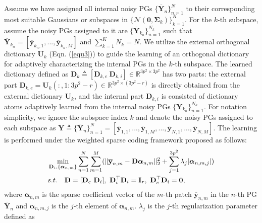\documentclass[10pt,twocolumn,letterpaper]{article}
\begin{document}
Assume we have assigned all internal noisy PGs $\{\mathbf{\overline{Y}}_{n}\}_{n=1}^{N}$ to their corresponding most suitable Gaussians or subspaces in $\{\mathcal{N}(\mathbf{0},\mathbf{\Sigma}_{k})\}_{k=1}^{K}$. For the $k$-th subspace, assume the noisy PGs assigned to it are $\{\mathbf{\overline{Y}}_{k_{n}}\}_{n=1}^{N_{k}}$ such that $\mathbf{\overline{Y}}_{k_{n}}=[\mathbf{\overline{y}}_{k_{n},1},...,\mathbf{\overline{y}}_{k_{n},M}]$ and $\sum_{k=1}^{K}N_{k}=N$. We utilize the external orthogonal dictionary $\mathbf{U}_{k}$ (Eqn. (\ref{equ3})) to guide the learning of an orthogonal dictionary for adaptively characterizing the internal PGs in the $k$-th subspace. The learned dictionary defined as $\mathbf{D}_{k}\triangleq[\mathbf{D}_{k,e}\ \mathbf{D}_{k,i}]\in \mathbb{R}^{3p^2\times 3p^2}$ has two parts: the external part $\mathbf{D}_{k,e}=\mathbf{U}_{k}(:,1:3p^2-r)\in\mathbb{R}^{3p^2\times (3p^2-r)}$ is directly obtained from the external dictionary $\mathbf{U}_{k}$, and the internal part $\mathbf{D}_{k,i}$ is consisted of dictionary atoms adaptively learned from the internal noisy PGs $\{\mathbf{\overline{Y}}_{k_{n}}\}_{n=1}^{N_{k}}$. For notation simplicity, we ignore the subspace index $k$ and denote the noisy PGs assigned to each subspace as $\mathbf{Y}\triangleq\{\mathbf{\overline{Y}}_{n}\}_{n=1}^{N} = [\mathbf{\overline{y}}_{1,1},...,\mathbf{\overline{y}}_{1,M},...,\mathbf{\overline{y}}_{N,1},...,\mathbf{\overline{y}}_{N,M}]$. The learning is performed under the weighted sparse coding framework proposed as follows:
\vspace{-2mm}
\begin{equation}\label{equ5}\vspace{-3mm}
\begin{split}
&\min_{\mathbf{D}_{i},\{\bm{\alpha}_{n,m}\}}
\sum_{n=1}^{N}\sum_{m=1}^{M}(\|\mathbf{\overline{y}}_{n,m}-\mathbf{D}\bm{\alpha}_{n,m}\|_{2}^{2}+\sum_{j=1}^{3p^{2}}\lambda_{j}|\bm{\alpha}_{n,m,j}|)
\\
&
s.t.
\quad
\mathbf{D}=[\mathbf{D}_{e}\ \mathbf{D}_{i}],\ \mathbf{D}_{i}^{\top}\mathbf{D}_{i} = \mathbf{I}_{r},\ \mathbf{D}_{e}^{\top}\mathbf{D}_{i} = \mathbf{0},
\end{split}
\end{equation}
where $\bm{\alpha}_{n,m}$ is the sparse coefficient vector of the $m$-th patch $\mathbf{\overline{y}}_{n,m}$ in the $n$-th PG $\mathbf{\overline{Y}}_{n}$ and $\bm{\alpha}_{n,m,j}$ is the $j$-th element of $\bm{\alpha}_{n,m}$. $\lambda_{j}$ is the $j$-th regularization parameter defined as
\vspace{-1mm}
\end{document}
